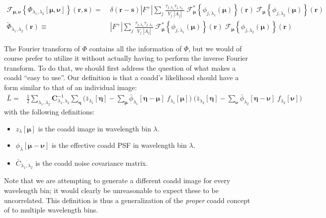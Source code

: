 \documentclass[DM,authoryear,toc]{lsstdoc}
\begin{document}
\begin{align}
    \mathcal{F}_{\bm{\mu},\bm{\nu}}\!\left\{
        \Phi_{\lambda_1,\lambda_2}[\bm{\mu},\bm{\nu}]
    \right\}\!\left(\bm{r},\bm{s}\right)
    =&\;
    \delta\!\left(\bm{r}-\bm{s}\right)
    |F^+|
    \sum_j
        \frac{
            \tau_{j,\lambda_1}
            \tau_{j,\lambda_2}\
        }{
            V_j \; |A_j|
        }
        \;
        \mathcal{F}^*_{\bm{\mu}}\!\left\{
            \phi_{j,\lambda_1}\!\left(\bm{\mu}\right)
        \right\}\!\left(\bm{r}\right)
        \;
        \mathcal{F}_{\bm{\mu}}\!\left\{
            \phi_{j,\lambda_2}\!\left(\bm{\mu}\right)
        \right\}\!\left(\bm{r}\right)
    \\
    \widetilde{\Phi}_{\lambda_1,\lambda_2}(\bm{r})
    \equiv &\;
    |F^+|
    \sum_j
        \frac{
            \tau_{j,\lambda_1}
            \tau_{j,\lambda_2}
        }{
            V_j \; |A_j|
        }
        \;
        \mathcal{F}^*_{\bm{\mu}}\!\left\{
            \phi_{j,\lambda_1}\!\left(\bm{\mu}\right)
        \right\}\!\left(\bm{r}\right)
        \;
        \mathcal{F}_{\bm{\mu}}\!\left\{
            \phi_{j,\lambda_2}\!\left(\bm{\mu}\right)
        \right\}\!\left(\bm{r}\right)
\label{eqn:phi-fourier-inputs}
\end{align}

The Fourier transform of $\Phi$ contains all the information of $\Phi$, but we would of course prefer to utilize it without actually having to perform the inverse Fourier transform.
To do that, we should first address the question of what makes a coadd ``easy to use''.
Our definition is that a coadd's likelihood should have a form similar to that of an individual image:
\begin{align}
\bar{L} =&
    \frac{1}{2}
    \sum_{\lambda_1,\lambda_2}
    \bm{C}^{-1}_{\lambda_1,\lambda_2}
    \sum_{\bm{\eta}}
    \bigg(
        \bar{z}_{\lambda_1}[\bm{\eta}]
        - \sum_{\bm{\mu}}\bar{\phi}_{\lambda_1}[\bm{\eta}-\bm{\mu}]
        \; f_{\lambda_1}[\bm{\mu}]
    \bigg)
    \;
    \bigg(
        \bar{z}_{\lambda_2}[\bm{\eta}]
        - \sum_{\bm{\nu}}\bar{\phi}_{\lambda_2}[\bm{\eta}-\bm{\nu}]
        \; f_{\lambda_2}[\bm{\nu}]
    \bigg)
    \label{eqn:natural-coadd-likelihood}
\end{align}
with the following definitions:
\begin{itemize}
    \item $z_{\lambda}[\bm{\mu}]$ is the coadd image in wavelength bin $\lambda$.
    \item $\phi_{\lambda}[\bm{\mu}-\bm{\nu}]$ is the effective coadd PSF in wavelength bin $\lambda$.
    \item $\bar{C}_{\lambda_1,\lambda_2}$ is the coadd noise covariance matrix.
\end{itemize}
Note that we are attempting to generate a different coadd image for every wavelength bin; it would clearly be unreasonable to expect these to be uncorrelated.
This definition is thus a generalization of the \emph{proper} coadd concept of \citet{2015arXiv151206879Z} to multiple wavelength bins.
\end{document}
